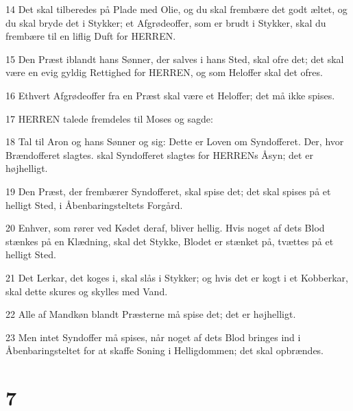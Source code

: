 \par 14 Det skal tilberedes på Plade med Olie, og du skal frembære det godt æltet, og du skal bryde det i Stykker; et Afgrødeoffer, som er brudt i Stykker, skal du frembære til en liflig Duft for HERREN.
\par 15 Den Præst iblandt hans Sønner, der salves i hans Sted, skal ofre det; det skal være en evig gyldig Rettighed for HERREN, og som Heloffer skal det ofres.
\par 16 Ethvert Afgrødeoffer fra en Præst skal være et Heloffer; det må ikke spises.
\par 17 HERREN talede fremdeles til Moses og sagde:
\par 18 Tal til Aron og hans Sønner og sig: Dette er Loven om Syndofferet. Der, hvor Brændofferet slagtes. skal Syndofferet slagtes for HERRENs Åsyn; det er højhelligt.
\par 19 Den Præst, der frembærer Syndofferet, skal spise det; det skal spises på et helligt Sted, i Åbenbaringsteltets Forgård.
\par 20 Enhver, som rører ved Kødet deraf, bliver hellig. Hvis noget af dets Blod stænkes på en Klædning, skal det Stykke, Blodet er stænket på, tvættes på et helligt Sted.
\par 21 Det Lerkar, det koges i, skal slås i Stykker; og hvis det er kogt i et Kobberkar, skal dette skures og skylles med Vand.
\par 22 Alle af Mandkøn blandt Præsterne må spise det; det er højhelligt.
\par 23 Men intet Syndoffer må spises, når noget af dets Blod bringes ind i Åbenbaringsteltet for at skaffe Soning i Helligdommen; det skal opbrændes.

\chapter{7}

